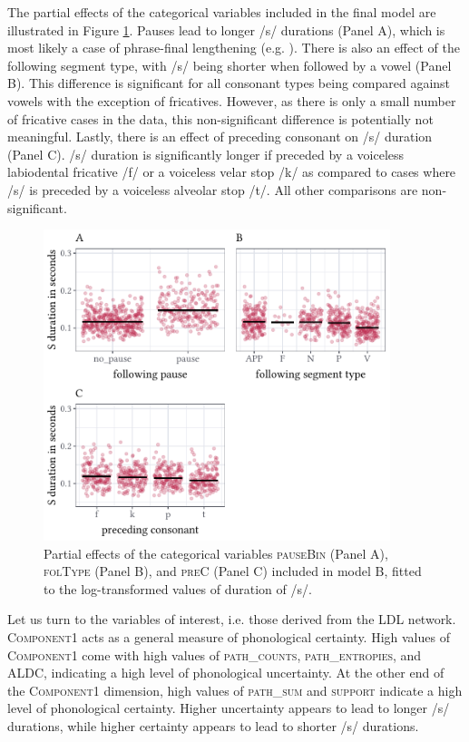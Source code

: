 The partial effects of the categorical variables included in the final model are illustrated in Figure \ref{fig:5_2}. Pauses lead to longer /s/ durations (Panel A), which is most likely a case of phrase-final lengthening (e.g. \cite{Cooper1981}). There is also an effect of the following segment type, with /s/ being shorter when followed by a vowel (Panel B). This difference is significant for all consonant types being compared against vowels with the exception of fricatives. However, as there is only a small number of fricative cases in the data, this non-significant difference is potentially not meaningful. Lastly, there is an effect of preceding consonant on /s/ duration (Panel C). /s/ duration is significantly longer if preceded by a voiceless labiodental fricative /f/ or a voiceless velar stop /k/ as compared to cases where /s/ is preceded by a voiceless alveolar stop /t/. All other comparisons are non-significant.

\begin{figure}
    \centering
    \includegraphics[width=0.9\textwidth]{figures/fig5.2.pdf}
    \caption{Partial effects of the categorical variables \textsc{pauseBin} (Panel A), \textsc{folType} (Panel B), and \textsc{preC} (Panel C) included in model B, fitted to the log-transformed values of duration of /s/.}
    \label{fig:5_2}
\end{figure}

Let us turn to the variables of interest, i.e. those derived from the LDL network. \textsc{Component1} acts as a general measure of phonological certainty. High values of \textsc{Component1} come with high values of \textsc{path\_counts}, \textsc{path\_entropies}, and \textsc{ALDC}, indicating a high level of phonological uncertainty. At the other end of the \textsc{Component1} dimension, high values of \textsc{path\_sum} and \textsc{support} indicate a high level of phonological certainty. Higher uncertainty appears to lead to longer /s/ durations, while higher certainty appears to lead to shorter /s/ durations.

